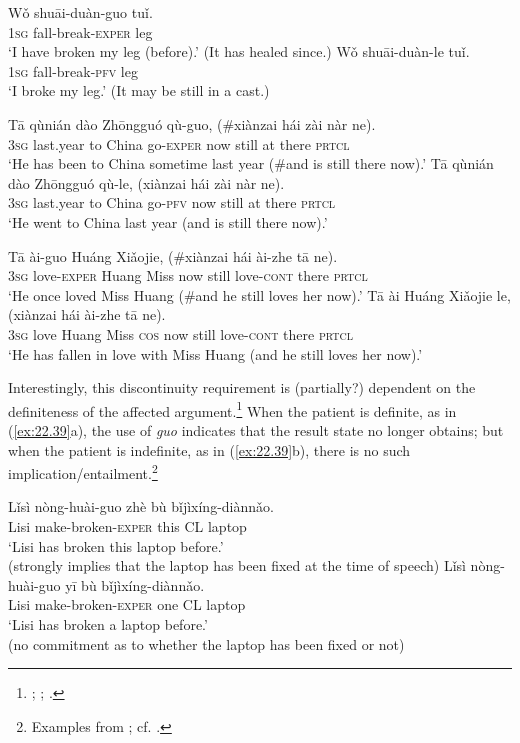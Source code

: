 \ea \label{ex:22.36}
\ea  \gll Wǒ  shuāi-duàn-guo  tuǐ.\\
\textsc{1sg}  fall-break-\textsc{exper}  leg\\
\glt ‘I have broken my leg (before).’ (It has healed since.) 
\ex \gll Wǒ  shuāi-duàn-le  tuǐ.\\
\textsc{1sg}  fall-break-\textsc{pfv}  leg\\
\glt ‘I broke my leg.’  (It may be still in a cast.)  
\z \z

\ea \label{ex:22.37}
\ea \gll Tā  qùnián  dào  Zhōngguó  qù-guo,  (\#xiànzai  hái  zài  nàr  ne).\\
\textsc{3sg}  last.year  to  China  go-\textsc{exper}    now  still  at  there  \textsc{prtcl}\\
\glt ‘He has been to China sometime last year (\#and is still there now).’ 
\ex \gll  Tā  qùnián  dào  Zhōngguó  qù-le,  (xiànzai  hái  zài  nàr  ne).\\
\textsc{3sg}  last.year  to  China  go-\textsc{pfv} now  still  at  there  \textsc{prtcl}\\
\glt ‘He went to China last year (and is still there now).’ 
\z \z

\ea \label{ex:22.38}
\ea \gll  Tā  ài-guo  Huáng  Xiǎojie,  (\#xiànzai  hái  ài-zhe  tā  ne).\\
\textsc{3sg}  love-\textsc{exper}  Huang  Miss now  still  love-\textsc{cont}  there  \textsc{prtcl}\\
\glt ‘He once loved Miss Huang (\#and he still loves her now).’ 
\ex \gll  Tā  ài  Huáng  Xiǎojie  le,  (xiànzai  hái  ài-zhe  tā  ne).\\
\textsc{3sg}  love  Huang  Miss \textsc{cos} now  still  love-\textsc{cont}  there  \textsc{prtcl}\\
\glt ‘He has fallen in love with Miss Huang (and he still loves her now).’  
\z \z


Interestingly, this discontinuity requirement is (partially?) dependent on the definiteness of the affected argument.\footnote{\citet{Lin2007}; \citet{Wu2008}; \citet{Chen2009}.} When the patient is definite, as in (\ref{ex:22.39}a), the use of \textit{guo} indicates that the result state no longer obtains; but when the patient is indefinite, as in (\ref{ex:22.39}b), there is no such implication/entailment.\footnote{Examples from \citet{Chen2009}; cf. \citet{Lin2007}.}


\ea \label{ex:22.39}
\ea  \gll Lǐsì  nòng-huài-guo  zhè  bù  bǐjìxíng-diànnǎo.\\
Lisi  make-broken-\textsc{exper}  this  CL  laptop\\
\glt ‘Lisi has broken this laptop before.’\\
(strongly implies that the laptop has been fixed at the time of speech)
\ex \gll  Lǐsì  nòng-huài-guo  yī  bù  bǐjìxíng-diànnǎo.\\
Lisi  make-broken-\textsc{exper}  one  CL  laptop\\
\glt ‘Lisi has broken a laptop before.’  \\
(no commitment as to whether the laptop has been fixed or not)
\z \z


